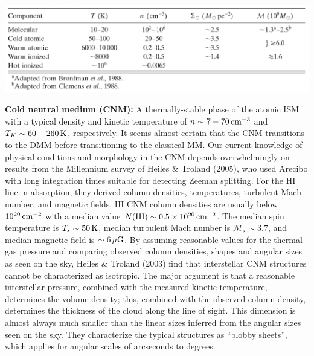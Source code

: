 \documentclass[a4paper,10pt]{article}
\begin{document}
\begin{table}[h]
\begin{center}
 \label{table:ismphases}
\includegraphics[width=15cm]{figures/ISMphases.png}
\end{center}
\end{table}

{\noindent}\textbf{Cold neutral medium (CNM):} A thermally-stable phase of the atomic ISM with a typical density and kinetic temperature of $n\sim7-70\,{\rm cm^{-3}}$ and $T_K\sim60-260\,{\rm K}$, respectively. It seems almost certain that the CNM transitions to the DMM before transitioning to the classical MM. Our current knowledge of physical conditions and morphology in the CNM depends overwhelmingly on results from the Millennium survey of Heiles \& Troland (2005), who used Arecibo with long integration times suitable for detecting Zeeman splitting. For the HI line in absorption, they derived column densities, temperatures, turbulent Mach number, and magnetic fields. HI CNM column densities are usually below $10^{20}\,{\rm cm^{-2}}$ with a median value $N({\rm HI})\sim0.5\times10^{20}\,{\rm cm^{-2}}$. The median spin temperature is $T_s\sim50\,{\rm K}$, median turbulent Mach number is $\mathcal{M}_s\sim3.7$, and median magnetic field is $\sim6\,\mu{\rm G}$. By assuming reasonable values for the thermal gas pressure and comparing observed column densities, shapes and angular sizes as seen on the sky, Heiles \& Troland (2003) find that interstellar CNM structures cannot be characterized as isotropic. The major argument is that a reasonable interstellar pressure, combined with the measured kinetic temperature, determines the volume density; this, combined with the observed column density, determines the thickness of the cloud along the line of sight. This dimension is almost always much smaller than the linear sizes inferred from the angular sizes seen on the sky. They characterize the typical structures as ``blobby sheets'', which applies for angular scales of arcseconds to degrees.
\end{document}
